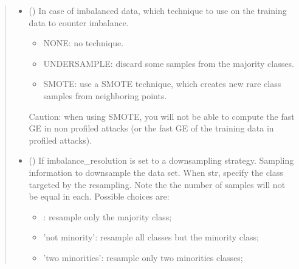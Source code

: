\documentclass[letterpaper,10pt,english]{sphinxmanual}
\begin{document}
\begin{fulllineitems}
\begin{fulllineitems}
\begin{quote}
\begin{description}
\begin{itemize}
\item {} 
\sphinxAtStartPar
{} ({\hyperref[\detokenize{MLSCAlib.Data:MLSCAlib.Data.custom_manager.ImbalanceResolution}]{}}) \textendash{} 
\sphinxAtStartPar
In case of imbalanced data, which technique to use on the training data to counter imbalance.
\begin{itemize}
\item {} 
\sphinxAtStartPar
NONE: no technique.

\item {} 
\sphinxAtStartPar
UNDERSAMPLE: discard some samples from the majority classes.

\item {} 
\sphinxAtStartPar
SMOTE: use a SMOTE technique, which creates new rare class samples from neighboring points.

\end{itemize}

\sphinxAtStartPar
Caution: when using SMOTE, you will not be able to compute the fast GE in non profiled attacks
(or the fast GE of the training data in profiled attacks).


\item {} 
\sphinxAtStartPar
{} (\sphinxstyleliteralemphasis{\sphinxupquote{, }}\sphinxstyleliteralemphasis{\sphinxupquote{, }}) \textendash{} 
\sphinxAtStartPar
If imbalance\_resolution is set to a downsampling strategy. Sampling information to downsample the data set.
When str, specify the class targeted by the resampling. Note the the number of samples will not be equal in each.
Possible choices are:
\begin{itemize}
\item {} 
\sphinxAtStartPar
{}: resample only the majority class;

\item {} 
\sphinxAtStartPar
’not minority’: resample all classes but the minority class;

\item {} 
\sphinxAtStartPar
’two minorities’: resample only two minorities classes;


\end{itemize}
\end{itemize}
\end{description}
\end{quote}
\end{fulllineitems}
\end{fulllineitems}
\end{document}
